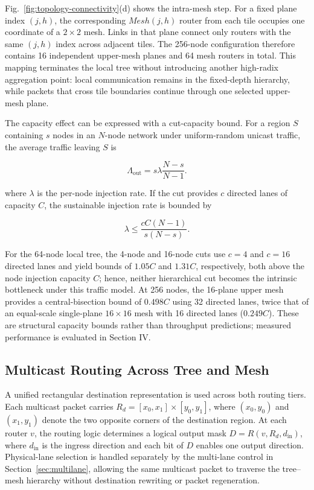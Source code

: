 \documentclass[conference]{IEEEtran}
\begin{document}
Fig.~\ref{fig:topology-connectivity}(d) shows the intra-mesh step.
For a fixed plane index \((j,h)\), the corresponding \(Mesh(j,h)\) router
from each tile occupies one coordinate of a \(2\times2\) mesh. Links in
that plane connect only routers with the same \((j,h)\) index across
adjacent tiles. The 256-node configuration therefore contains 16
independent upper-mesh planes and 64 mesh routers in total. This mapping terminates
the local tree without introducing another high-radix aggregation point:
local communication remains in the fixed-depth hierarchy, while packets
that cross tile boundaries continue through one selected upper-mesh
plane.

The capacity effect can be expressed with a cut-capacity bound.
For a region \(S\) containing \(s\) nodes in an \(N\)-node network under
uniform-random unicast traffic, the average traffic leaving \(S\) is

\begin{equation}\label{eq:cut-traffic} \Lambda_{\mathrm{out}} = s\lambda\frac{N-s}{N-1}. \end{equation}

where \(\lambda\) is the per-node injection rate. If the cut provides
\(c\) directed lanes of capacity \(C\), the sustainable injection rate is
bounded by

\begin{equation}\label{eq:cut-bound} \lambda \leq \frac{cC(N-1)}{s(N-s)}. \end{equation}

For the 64-node local tree, the 4-node and 16-node cuts use \(c=4\) and
\(c=16\) directed lanes and yield bounds of \(1.05C\) and \(1.31C\),
respectively, both above the node injection capacity \(C\); hence, neither
hierarchical cut becomes the intrinsic bottleneck under this traffic
model. At 256 nodes, the 16-plane upper mesh provides a central-bisection
bound of \(0.498C\) using 32 directed lanes, twice that of an equal-scale
single-plane \(16 \times 16\) mesh with 16 directed lanes (\(0.249C\)).
These are structural capacity bounds rather than throughput predictions;
measured performance is evaluated in Section IV.

\subsection{Multicast Routing Across Tree and Mesh}\label{sec:multicast}

A unified rectangular destination representation is used across both
routing tiers. Each multicast packet carries
\(R_{d} = \left\lbrack x_{0},x_{1} \right\rbrack \times \left\lbrack y_{0},y_{1} \right\rbrack\),
where \(\left( x_{0},y_{0} \right)\) and \(\left( x_{1},y_{1} \right)\)
denote the two opposite corners of the destination region. At each
router \(v\), the routing logic determines a logical output mask
\(D = R\left( v,R_{d},d_{\mathrm{in}} \right)\), where \(d_{\mathrm{in}}\) is the ingress
direction and each bit of \(D\) enables one output direction.
Physical-lane selection is handled separately by the multi-lane control
in Section~\ref{sec:multilane}, allowing the same multicast packet to traverse the
tree--mesh hierarchy without destination rewriting or packet
regeneration.
\end{document}
